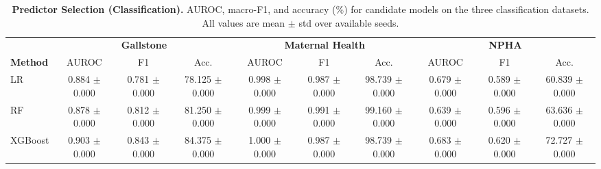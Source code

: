 \begin{table}[ht]
\centering
\caption{\textbf{Predictor Selection (Classification).} AUROC, macro-F1, and accuracy (\%) for candidate models on the three classification datasets. All values are mean $\pm$ std over available seeds.}
\label{tab:clf_results}
\renewcommand{\arraystretch}{1.2}
\begin{tabular}{l ccc ccc ccc}
\toprule
& \multicolumn{3}{c}{\textbf{Gallstone}} & \multicolumn{3}{c}{\textbf{Maternal Health}} & \multicolumn{3}{c}{\textbf{NPHA}} \\
\cmidrule(lr){2-4}\cmidrule(lr){5-7}\cmidrule(lr){8-10}
\textbf{Method} & AUROC & F1 & Acc. & AUROC & F1 & Acc. & AUROC & F1 & Acc. \\
\midrule
LR & 0.884 $\pm$ 0.000 & 0.781 $\pm$ 0.000 & 78.125 $\pm$ 0.000 & 0.998 $\pm$ 0.000 & 0.987 $\pm$ 0.000 & 98.739 $\pm$ 0.000 & 0.679 $\pm$ 0.000 & 0.589 $\pm$ 0.000 & 60.839 $\pm$ 0.000 \\
RF & 0.878 $\pm$ 0.000 & 0.812 $\pm$ 0.000 & 81.250 $\pm$ 0.000 & 0.999 $\pm$ 0.000 & 0.991 $\pm$ 0.000 & 99.160 $\pm$ 0.000 & 0.639 $\pm$ 0.000 & 0.596 $\pm$ 0.000 & 63.636 $\pm$ 0.000 \\
XGBoost & 0.903 $\pm$ 0.000 & 0.843 $\pm$ 0.000 & 84.375 $\pm$ 0.000 & 1.000 $\pm$ 0.000 & 0.987 $\pm$ 0.000 & 98.739 $\pm$ 0.000 & 0.683 $\pm$ 0.000 & 0.620 $\pm$ 0.000 & 72.727 $\pm$ 0.000 \\
\bottomrule
\end{tabular}
\end{table}
